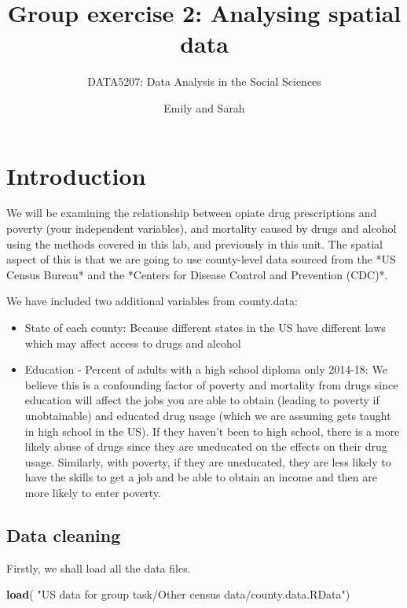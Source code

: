 \documentclass[
]{article}
\title{Group exercise 2: Analysing spatial data}
\subtitle{DATA5207: Data Analysis in the Social Sciences}
\author{Emily and Sarah}
\date{}
\newenvironment{Shaded}{\begin{snugshade}}{\end{snugshade}}
\newcommand{\FunctionTok}[1]{\textcolor[rgb]{0.13,0.29,0.53}{\textbf{#1}}}
\newcommand{\NormalTok}[1]{#1}
\newcommand{\StringTok}[1]{\textcolor[rgb]{0.31,0.60,0.02}{#1}}
\begin{document}
\maketitle

\hypertarget{introduction}{%
\section{Introduction}\label{introduction}}

We will be examining the relationship between opiate drug prescriptions
and poverty (your independent variables), and mortality caused by drugs
and alcohol using the methods covered in this lab, and previously in
this unit. The spatial aspect of this is that we are going to use
county-level data sourced from the *US Census Bureau* and the *Centers
for Disease Control and Prevention (CDC)*.

We have included two additional variables from county.data:

\begin{itemize}
\item
  State of each county: Because different states in the US have
  different laws which may affect access to drugs and alcohol
\item
  Education - Percent of adults with a high school diploma only 2014-18:
  We believe this is a confounding factor of poverty and mortality from
  drugs since education will affect the jobs you are able to obtain
  (leading to poverty if unobtainable) and educated drug usage (which we
  are assuming gets taught in high school in the US). If they haven't
  been to high school, there is a more likely abuse of drugs since they
  are uneducated on the effects on their drug usage. Similarly, with
  poverty, if they are uneducated, they are less likely to have the
  skills to get a job and be able to obtain an income and then are more
  likely to enter poverty.
\end{itemize}

\hypertarget{data-cleaning}{%
\subsection{Data cleaning}\label{data-cleaning}}

Firstly, we shall load all the data files.

\begin{Shaded}
\begin{Highlighting}[]
\FunctionTok{load}\NormalTok{(}
  \StringTok{"US data for group task/Other census data/county.data.RData"}\NormalTok{)}
\end{Highlighting}
\end{Shaded}
\end{document}
